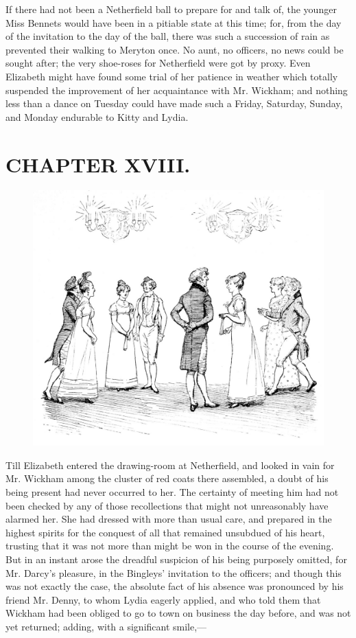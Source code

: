 If there had not been a Netherfield ball to prepare for and talk of, the younger Miss Bennets would have been in a pitiable state at this time; for, from the day of the invitation to the day of the ball, there was such a succession of rain as prevented their walking to Meryton once. No aunt, no officers, no news could be sought after; the very shoe-roses for Netherfield were got by proxy. Even Elizabeth might have found some trial of her patience in weather which totally suspended the improvement of her acquaintance with Mr. Wickham; and nothing less than a dance on Tuesday could have made such a Friday, Saturday, Sunday, and Monday endurable to Kitty and Lydia.

\chapter{CHAPTER XVIII.}

\begin{figure}[htbp]
    \centering
    \includegraphics[width=\textwidth]{illustrations/i_142_a.jpg}
\end{figure}


Till Elizabeth entered the drawing-room at Netherfield, and looked in vain for Mr. Wickham among the cluster of red coats there assembled, a doubt of his being present had never occurred to her. The certainty of meeting him had not been checked by any of those recollections that might not unreasonably have alarmed her. She had dressed with more than usual care, and prepared in the highest spirits for the conquest of all that remained unsubdued of his heart, trusting that it was not more than might be won in the course of the evening. But in an instant arose the dreadful suspicion of his being purposely omitted, for Mr. Darcy's pleasure, in the Bingleys' invitation to the officers; and though this was not exactly the case, the absolute fact of his absence was pronounced by his friend Mr. Denny, to whom Lydia eagerly applied, and who told them that Wickham had been obliged to go to town on business the day before, and was not yet returned; adding, with a significant smile,---

